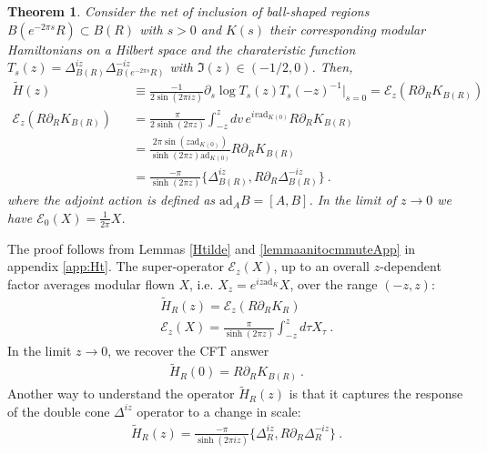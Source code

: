\documentclass[a4paper,11pt]{article}
\newtheorem{theorem}{Theorem}
\theoremstyle{definition}
\newcommand{\nn}{\nonumber}
\newcommand{\p}{\partial}
\newcommand{\ad}{\text{ad}}
\begin{document}
\begin{theorem}\label{theoremQFT}
Consider the net of inclusion of ball-shaped regions $B(e^{-2\pi s}R)\subset B(R)$ with $s>0$ and $K(s)$ their corresponding modular Hamiltonians on a Hilbert space and the charateristic function $T_s(z)=\Delta^{iz}_{B(R)}\Delta^{-iz}_{B(e^{-2\pi s}R)}$ with $\Im(z)\in (-1/2,0)$. Then,
    \begin{eqnarray}
        \tilde{H}(z) &&\equiv \frac{{-1}}{2\sin(2\pi iz)}\p_s\log T_s(z)T_s(-z)^{-1}\Big|_{s=0}=\mathcal{E}_z(R\p_R K_{B(R)})\nn\\
        \mathcal{E}_z(R\p_R K_{B(R)})&&=\frac{\pi}{2\sinh(2\pi z)}\int_{-z}^{z} dv \, e^{i v \ad_{K(0)}} R\p_R K_{B(R)}\nn\\
        &&=\frac{2\pi \sin(z \ad_{K(0)})}{\sinh(2\pi z)\ad_{K(0)}} R\p_R K_{B(R)}\nn\\
        &&=\frac{{-}\pi}{\sinh(2\pi z)}\{\Delta_{B(R)}^{iz},R\p_R\Delta_{B(R)}^{-iz}\}\ .
    \end{eqnarray}
    where the adjoint action is defined as $\ad_A B = [A, B]$. In the limit of $z\to 0$ we have $\mathcal{E}_0(X)=\frac{1}{2\pi}X$.
\end{theorem}
The proof follows from Lemmas \ref{Htilde} and \ref{lemmaanitocmmuteApp} in appendix \ref{app:Ht}. The super-operator $\mathcal{E}_z(X)$, up to an overall $z$-dependent factor averages modular flown $X$, i.e. $X_z=e^{i z \ad_K}X$, over the range $(-z,z)$:
\begin{eqnarray}
&&\tilde{H}_R(z)=\mathcal{E}_z(R \p_R K_R)\nn\\
   && \mathcal{E}_z(X)=\frac{\pi}{\sinh(2\pi z)}\int_{-z}^z d\tau X_\tau\ .
\end{eqnarray}
In the limit $z\to 0$, we recover the CFT answer 
\begin{eqnarray}
    \tilde{H}_R(0)=R \p_R K_{B(R)}\ .
\end{eqnarray}
Another way to understand the operator $\tilde{H}_R(z)$ is that it captures the response of the double cone $\Delta^{iz}$ operator to a change in scale:
\begin{eqnarray}
    \tilde{H}_R(z)=\frac{{-}\pi}{\sinh(2\pi iz)}\{\Delta_R^{iz},R\p_R \Delta_R^{-iz}\}\ .
\end{eqnarray}
\end{document}
